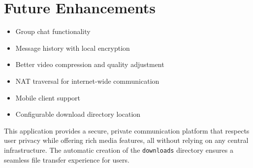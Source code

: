 \documentclass{article}
\begin{document}
\section*{Future Enhancements}
\begin{itemize}
    \item Group chat functionality
    \item Message history with local encryption
    \item Better video compression and quality adjustment
    \item NAT traversal for internet-wide communication
    \item Mobile client support
    \item Configurable download directory location
\end{itemize}

This application provides a secure, private communication platform that respects user privacy while offering rich media features, all without relying on any central infrastructure. The automatic creation of the \texttt{downloads} directory ensures a seamless file transfer experience for users.
\end{document}
